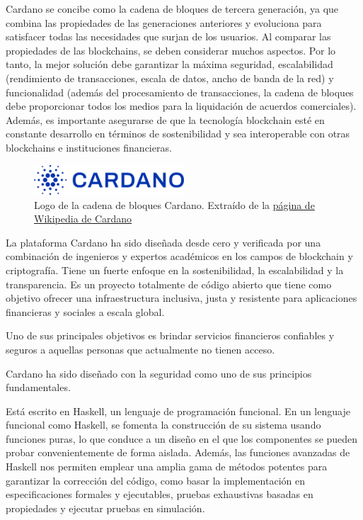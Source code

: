 \documentclass[12pt]{book}
\begin{document}
Cardano se concibe como la cadena de bloques de tercera generación, ya que combina las propiedades de las generaciones anteriores y evoluciona para satisfacer todas las necesidades que surjan de los usuarios. Al comparar las propiedades de las blockchains, se deben considerar muchos aspectos. Por lo tanto, la mejor solución debe garantizar la máxima seguridad, escalabilidad (rendimiento de transacciones, escala de datos, ancho de banda de la red) y funcionalidad (además del procesamiento de transacciones, la cadena de bloques debe proporcionar todos los medios para la liquidación de acuerdos comerciales). Además, es importante asegurarse de que la tecnología blockchain esté en constante desarrollo en términos de sostenibilidad y sea interoperable con otras blockchains e instituciones financieras.

\begin{figure}[H]
	\centering
	\includegraphics[width=0.5\textwidth]{Cardano_logo.png}
	\caption{Logo de la cadena de bloques Cardano. Extraído de la \href{https://en.wikipedia.org/wiki/Cardano_(blockchain_platform)}{página de Wikipedia de Cardano}}\label{fig:Cardano_logo}
\end{figure}


La plataforma Cardano ha sido diseñada desde cero y verificada por una combinación de ingenieros y expertos académicos en los campos de blockchain y criptografía.
Tiene un fuerte enfoque en la sostenibilidad, la escalabilidad y la transparencia.
Es un proyecto totalmente de código abierto que tiene como objetivo ofrecer una infraestructura inclusiva, justa y resistente para aplicaciones financieras y sociales a escala global.

Uno de sus principales objetivos es brindar servicios financieros confiables y seguros a aquellas personas que actualmente no tienen acceso.

Cardano ha sido diseñado con la seguridad como uno de sus principios fundamentales.

Está escrito en Haskell, un lenguaje de programación funcional.
En un lenguaje funcional como Haskell, se fomenta la construcción de su sistema usando funciones puras, lo que conduce a un diseño en el que los componentes se pueden probar convenientemente de forma aislada.
Además, las funciones avanzadas de Haskell nos permiten emplear una amplia gama de métodos potentes para garantizar la corrección del código, como basar la implementación en especificaciones formales y ejecutables, pruebas exhaustivas basadas en propiedades y ejecutar pruebas en simulación.
\end{document}

